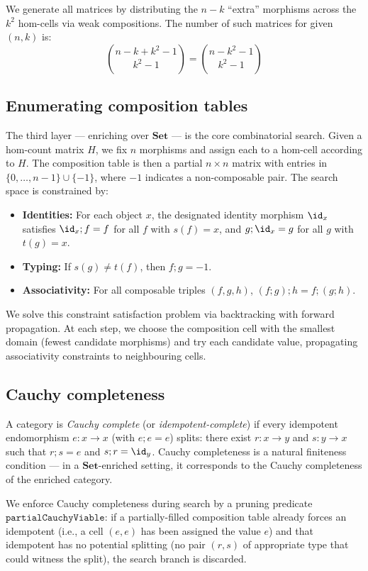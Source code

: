 \documentclass[12pt,a4paper]{amsart}
\theoremstyle{definition}
\theoremstyle{remark}
\newcommand{\Set}{\mathbf{Set}}
\begin{document}
We generate all matrices by distributing the $n - k$ ``extra'' morphisms
across the $k^2$ hom-cells via weak compositions.  The number of such
matrices for given $(n,k)$ is:
\[
\binom{n - k + k^2 - 1}{k^2 - 1} = \binom{n - k^2 - 1}{k^2 - 1}
\]

\subsection{Enumerating composition tables}

The third layer --- enriching over $\Set$ --- is the core combinatorial
search.  Given a hom-count matrix $H$, we fix $n$ morphisms and assign
each to a hom-cell according to $H$.  The composition table is then a
partial $n \times n$ matrix with entries in $\{0,\dots,n-1\} \cup \{-1\}$,
where $-1$ indicates a non-composable pair.  The search space is
constrained by:

\begin{itemize}
\item \textbf{Identities:} For each object $x$, the designated identity
  morphism $\id_x$ satisfies $\id_x ; f = f$ for all $f$ with
  $s(f) = x$, and $g ; \id_x = g$ for all $g$ with $t(g) = x$.
\item \textbf{Typing:} If $s(g) \neq t(f)$, then $f; g = -1$.
\item \textbf{Associativity:} For all composable triples $(f,g,h)$,
  $(f;g);h = f;(g;h)$.
\end{itemize}

We solve this constraint satisfaction problem via backtracking with
forward propagation.  At each step, we choose the composition cell with
the smallest domain (fewest candidate morphisms) and try each candidate
value, propagating associativity constraints to neighbouring cells.

\subsection{Cauchy completeness}

A category is \emph{Cauchy complete} (or \emph{idempotent-complete}) if
every idempotent endomorphism $e : x \to x$ (with $e;e = e$) splits:
there exist $r : x \to y$ and $s : y \to x$ such that $r;s = e$ and
$s;r = \id_y$.  Cauchy completeness is a natural finiteness condition
--- in a $\Set$-enriched setting, it corresponds to the Cauchy completeness
of the enriched category.

We enforce Cauchy completeness during search by a pruning predicate
$\texttt{partialCauchyViable}$: if a partially-filled composition table
already forces an idempotent (i.e., a cell $(e,e)$ has been assigned the
value $e$) and that idempotent has no potential splitting (no pair
$(r,s)$ of appropriate type that could witness the split), the search
branch is discarded.
\end{document}

